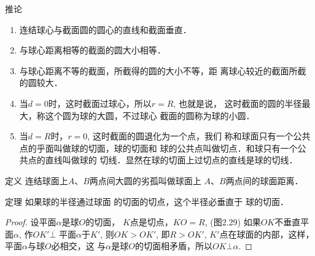 \begin{blk}{推论}
\begin{enumerate}
\item 连结球心与截面圆的圆心的直线和截面垂直．
\item 与球心距离相等的截面的圆大小相等．
\item 与球心距离不等的截面，所截得的圆的大小不等，距
离球心较近的截面所截的圆较大．
\item 当$d=0$时，这时截面过球心，所以$r=R$, 也就是说，
这时截面的圆的半径最大，称这个圆为球的大圆，不过球心
截面的圆称为球的小圆．
\item 当$d=R$时，$r=0$, 这时截面的圆退化为一个点，我们
称和球面只有一个公共点的乎面叫做球的切面，球的切面和
球的公共点叫做切点．和球只有一个公共点的直线叫做球的
切线．显然在球的切面上过切点的直线是球的切线．
\end{enumerate}
    
\end{blk}

\begin{blk}{定义} 
    连结球面上$A$、$B$两点间大圆的劣孤叫做球面上
$A$、$B$两点间的球面距离．
\end{blk}

\begin{blk}
    {定理} 如果球的半径通过球面
    的切面的切点，这个半径必垂直于
    球的切面．
\end{blk}

\begin{figure}[htp]
    \centering
{}   
    \caption{}
\end{figure}

\begin{proof}
    设平面$\alpha$是球$O$的切面，
    $K$点是切点，$KO=R$, (图2.29)
    如果$OK$不垂直平面$\alpha$, 作$OK'\bot$
    平面$\alpha$于$K'$, 则$OK>OK'$, 即$R>OK'$, $K'$点在球面的内部，这样，平面$\alpha$与球$O$必相交，这
与$\alpha$是球$O$的切面相矛盾，所以$OK\bot\alpha$.
\end{proof}

